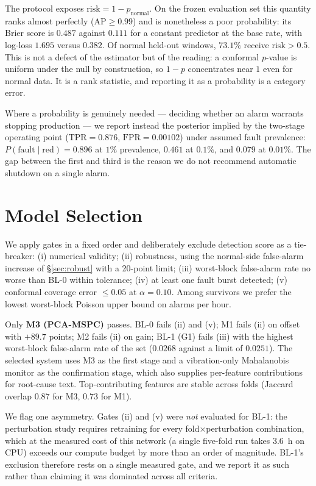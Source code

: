 \documentclass{article}
\begin{document}
The protocol exposes $\mathrm{risk} = 1 - p_{\text{normal}}$. On the frozen
evaluation set this quantity ranks almost perfectly ($\mathrm{AP} \ge 0.99$)
and is nonetheless a poor probability: its Brier score is $\mathbf{0.487}$
against $\mathbf{0.111}$ for a constant predictor at the base rate, with
log-loss $1.695$ versus $0.382$. Of normal held-out windows, $73.1\%$ receive
$\mathrm{risk} > 0.5$. This is not a defect of the estimator but of the
reading: a conformal $p$-value is uniform under the null by construction, so
$1-p$ concentrates near $1$ even for normal data. It is a rank statistic, and
reporting it as a probability is a category error.

Where a probability is genuinely needed --- deciding whether an alarm warrants
stopping production --- we report instead the posterior implied by the
two-stage operating point ($\mathrm{TPR} = 0.876$, $\mathrm{FPR} = 0.00102$)
under assumed fault prevalence:
$P(\text{fault}\mid\text{red}) = 0.896$ at $1\%$ prevalence, $0.461$ at
$0.1\%$, and $0.079$ at $0.01\%$. The gap between the first and third is the
reason we do not recommend automatic shutdown on a single alarm.

\section{Model Selection}
\label{sec:selection}

We apply gates in a fixed order and deliberately exclude detection score as a
tie-breaker: (i) numerical validity; (ii) robustness, using the normal-side
false-alarm increase of \S\ref{sec:robust} with a 20-point limit; (iii)
worst-block false-alarm rate no worse than BL-0 within tolerance; (iv) at
least one fault burst detected; (v) conformal coverage error
$\le 0.05$ at $\alpha=0.10$. Among survivors we prefer the lowest worst-block
Poisson upper bound on alarms per hour.

Only \textbf{M3 (PCA-MSPC)} passes. BL-0 fails (ii) and (v); M1 fails (ii) on
offset with $+89.7$ points; M2 fails (ii) on gain; BL-1 (G1) fails (iii) with
the highest worst-block false-alarm rate of the set ($0.0268$ against a limit
of $0.0251$). The selected system uses M3 as the first stage and a
vibration-only Mahalanobis monitor as the confirmation stage, which also
supplies per-feature contributions for root-cause text. Top-contributing
features are stable across folds (Jaccard overlap $0.87$ for M3, $0.73$ for
M1).

We flag one asymmetry. Gates (ii) and (v) were \emph{not} evaluated for BL-1:
the perturbation study requires retraining for every fold$\times$perturbation
combination, which at the measured cost of this network (a single five-fold
run takes \SI{3.6}{\hour} on CPU) exceeds our compute budget by more than an
order of magnitude. BL-1's exclusion therefore rests on a single measured
gate, and we report it as such rather than claiming it was dominated across
all criteria.
\end{document}
